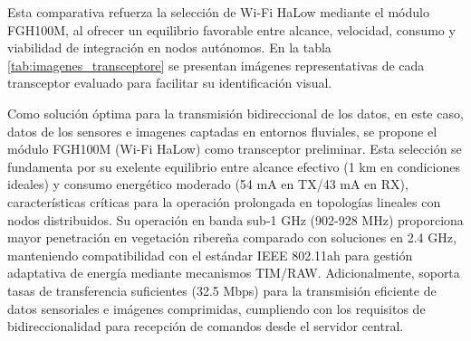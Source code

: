 Esta comparativa refuerza la selección de Wi-Fi HaLow mediante el módulo FGH100M, al ofrecer un equilibrio favorable entre alcance, velocidad, consumo y viabilidad de integración en nodos autónomos. En la tabla \ref{tab:imagenes_transceptore} se presentan imágenes representativas de cada transceptor evaluado para facilitar su identificación visual.


\begin{table}[H]
\renewcommand{\arraystretch}{1.5}
\centering
\caption{Ilustraciones transceptores}
\label{tab:imagenes_transceptore}
\end{table}


Como solución óptima para la transmisión bidireccional de los datos, en este caso, datos de los sensores e imagenes captadas en entornos fluviales, se propone el módulo FGH100M (Wi-Fi HaLow) como transceptor preliminar. Esta selección se fundamenta por su  exelente equilibrio entre alcance efectivo (1 km en condiciones ideales) y consumo energético moderado (54 mA en TX/43 mA en RX), características críticas para la operación prolongada en topologías lineales con nodos distribuidos. Su operación en banda sub-1 GHz (902-928 MHz) proporciona mayor penetración en vegetación ribereña comparado con soluciones en 2.4 GHz, manteniendo compatibilidad con el estándar IEEE 802.11ah para gestión adaptativa de energía mediante mecanismos TIM/RAW. Adicionalmente, soporta tasas de transferencia suficientes (32.5 Mbps) para la transmisión eficiente de datos sensoriales e imágenes comprimidas, cumpliendo con los requisitos de bidireccionalidad para recepción de comandos desde el servidor central.


